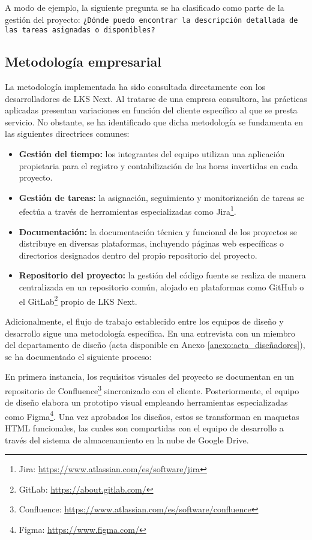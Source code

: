 A modo de ejemplo, la siguiente pregunta se ha clasificado como parte de la gestión del proyecto: \texttt{¿Dónde puedo encontrar la descripción detallada de las tareas asignadas o disponibles?}

\subsection{Metodología empresarial}
La metodología implementada ha sido consultada directamente con los desarrolladores de LKS Next. Al tratarse de una empresa consultora, las prácticas aplicadas presentan variaciones en función del cliente específico al que se presta servicio. No obstante, se ha identificado que dicha metodología se fundamenta en las siguientes directrices comunes:
\begin{itemize}
\item\textbf{Gestión del tiempo: }los integrantes del equipo utilizan una aplicación propietaria para el registro y contabilización de las horas invertidas en cada proyecto.
\item\textbf{Gestión de tareas: }la asignación, seguimiento y monitorización de tareas se efectúa a través de herramientas especializadas como Jira\footnote{Jira: \url{https://www.atlassian.com/es/software/jira}}.
\item\textbf{Documentación: }la documentación técnica y funcional de los proyectos se distribuye en diversas plataformas, incluyendo páginas web específicas o directorios designados dentro del propio repositorio del proyecto.
\item\textbf{Repositorio del proyecto: }la gestión del código fuente se realiza de manera centralizada en un repositorio común, alojado en plataformas como GitHub o el GitLab\footnote{GitLab: \url{https://about.gitlab.com/}} propio de LKS Next.

\end{itemize}
Adicionalmente, el flujo de trabajo establecido entre los equipos de diseño y desarrollo sigue una metodología específica. En una entrevista con un miembro del departamento de diseño (acta disponible en Anexo \ref{anexo:acta_diseñadores}), se ha documentado el siguiente proceso:

En primera instancia, los requisitos visuales del proyecto se documentan en un repositorio de Confluence\footnote{Confluence: \url{https://www.atlassian.com/es/software/confluence}} sincronizado con el cliente. Posteriormente, el equipo de diseño elabora un prototipo visual empleando herramientas especializadas como Figma\footnote{Figma: \url{https://www.figma.com/}}. Una vez aprobados los diseños, estos se transforman en maquetas HTML funcionales, las cuales son compartidas con el equipo de desarrollo a través del sistema de almacenamiento en la nube de Google Drive.


